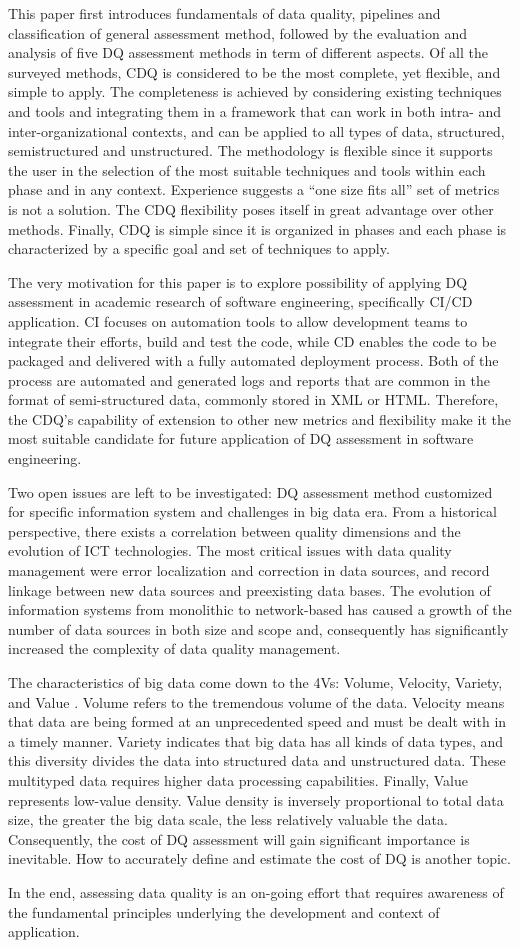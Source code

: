 \documentclass[pdftex,english,oribibl]{llncs}
\begin{document}
This paper first introduces fundamentals of data quality, pipelines and classification of general assessment method, followed by the evaluation and analysis of five DQ assessment methods in term of different aspects.
Of all the surveyed methods, CDQ is considered to be the most complete, yet flexible, and simple to apply.
The completeness is achieved by considering existing techniques and tools and integrating them in a framework that can work in both intra- and inter-organizational contexts, and can be applied to all types of data, structured, semistructured and unstructured.
The methodology is flexible since it supports the user in the selection of the most suitable techniques and tools within each phase and in any context.
Experience suggests a “one size fits all” set of metrics is not a solution. The CDQ flexibility poses itself in great advantage over other methods.
Finally, CDQ is simple since it is organized in phases and each phase is characterized by a specific goal and set of techniques to apply.

The very motivation for this paper is to explore possibility of applying DQ assessment in academic research of software engineering, specifically CI/CD application. CI focuses on automation tools to allow development teams to integrate their efforts, build and test the code, while CD enables the code to be packaged and delivered with a fully automated deployment process. Both of the process are automated and generated logs and reports that are common in the format of semi-structured data, commonly stored in XML or HTML.
Therefore, the CDQ's capability of extension to other new metrics and flexibility make it the most suitable candidate for future application of DQ assessment in software engineering.

Two open issues are left to be investigated: DQ assessment method customized for specific information system and challenges in big data era.
From a historical perspective, there exists a correlation between quality dimensions and the evolution of ICT technologies.
The most critical issues with data quality management were error localization and correction in data sources, and record linkage between new data sources and preexisting data bases.
The evolution of information systems from monolithic to network-based has caused a growth of the number of data sources in both size and scope and, consequently has significantly increased the complexity of data quality management.

The characteristics of big data come down to the 4Vs: Volume, Velocity, Variety, and Value \cite{Katal2013BigData}. Volume refers to the tremendous volume of the data. Velocity means that data are being formed at an unprecedented speed and must be dealt with in a timely manner. Variety indicates that big data has all kinds of data types, and this diversity divides the data into structured data and unstructured data. These multityped data requires higher data processing capabilities.
Finally, Value represents low-value density. Value density is inversely proportional to total data size, the greater the big data scale, the less relatively valuable the data. Consequently, the cost of DQ assessment will gain significant importance is inevitable. How to accurately define and estimate the cost of DQ is another topic.

In the end, assessing data quality is an on-going effort that requires awareness of the fundamental principles underlying the development and context of application.


\end{document}
